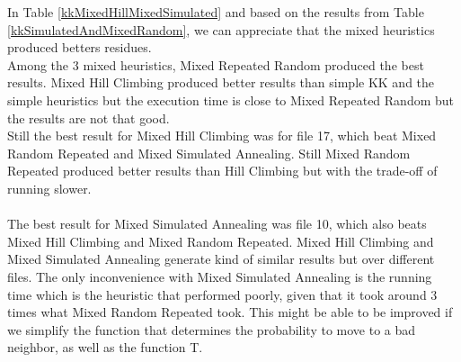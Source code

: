\documentclass[tikz, 12pt]{scrartcl}
\begin{document}
In Table \ref{kkMixedHillMixedSimulated} and based on the results from Table \ref{kkSimulatedAndMixedRandom}, we can appreciate that the mixed heuristics produced betters residues. \\
Among the 3 mixed heuristics, Mixed Repeated Random produced the best results. Mixed Hill Climbing produced better results than simple KK and the simple heuristics but the execution time is close to Mixed Repeated Random but the results are not that good. \\
Still the best result for Mixed Hill Climbing was for file 17, which beat Mixed Random Repeated and Mixed Simulated Annealing. Still Mixed Random Repeated produced better results than Hill Climbing but with the trade-off of running slower.\\
\\
The best result for Mixed Simulated Annealing was file 10, which also beats Mixed Hill Climbing and Mixed Random Repeated. Mixed Hill Climbing and Mixed Simulated Annealing generate kind of similar results but over different files. The only inconvenience with Mixed Simulated Annealing is the running time which is the heuristic that performed poorly, given that it took around 3 times what Mixed Random Repeated took. This might be able to be improved if we simplify the function that determines the probability to move to a bad neighbor, as well as the function T. 
\end{document}
